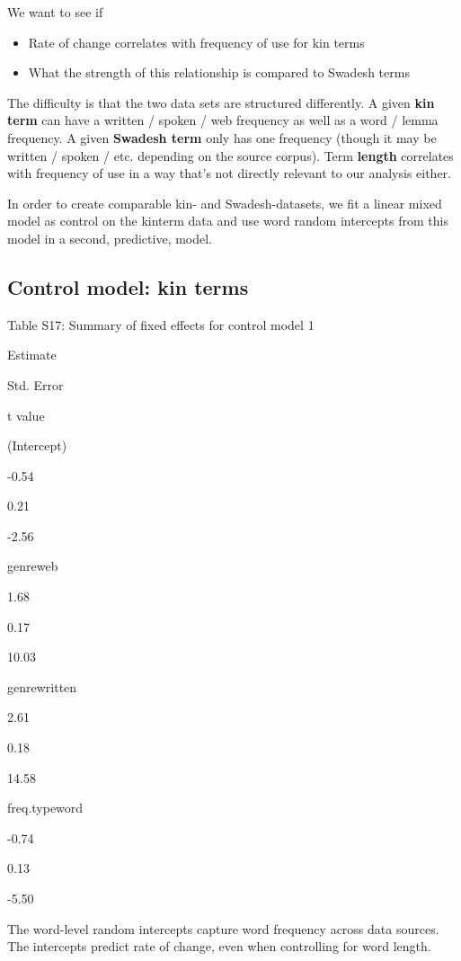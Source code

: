 \documentclass[]{article}
\providecommand{\tightlist}{%
  \setlength{\itemsep}{0pt}\setlength{\parskip}{0pt}}
\begin{document}
We want to see if

\begin{itemize}
\tightlist
\item
  Rate of change correlates with frequency of use for kin terms
\item
  What the strength of this relationship is compared to Swadesh terms
\end{itemize}

The difficulty is that the two data sets are structured differently. A
given \textbf{kin term} can have a written / spoken / web frequency as
well as a word / lemma frequency. A given \textbf{Swadesh term} only has
one frequency (though it may be written / spoken / etc. depending on the
source corpus). Term \textbf{length} correlates with frequency of use in
a way that's not directly relevant to our analysis either.

In order to create comparable kin- and Swadesh-datasets, we fit a linear
mixed model as control on the kinterm data and use word random
intercepts from this model in a second, predictive, model.

\hypertarget{control-model-kin-terms}{%
\subsection{Control model: kin terms}\label{control-model-kin-terms}}

Table S17: Summary of fixed effects for control model 1

Estimate

Std. Error

t value

(Intercept)

-0.54

0.21

-2.56

genreweb

1.68

0.17

10.03

genrewritten

2.61

0.18

14.58

freq.typeword

-0.74

0.13

-5.50

The word-level random intercepts capture word frequency across data
sources. The intercepts predict rate of change, even when controlling
for word length.
\end{document}
